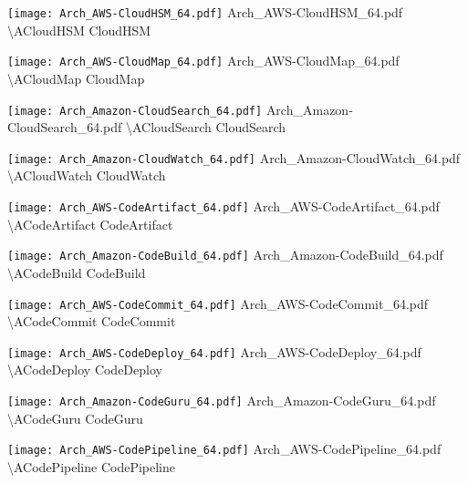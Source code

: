  {\texttt{[image: Arch\_AWS-CloudHSM\_64.pdf]}} {Arch\_AWS-CloudHSM\_64.pdf} {{\textbackslash}ACloudHSM} {CloudHSM}

 {\texttt{[image: Arch\_AWS-CloudMap\_64.pdf]}} {Arch\_AWS-CloudMap\_64.pdf} {{\textbackslash}ACloudMap} {CloudMap}

 {\texttt{[image: Arch\_Amazon-CloudSearch\_64.pdf]}} {Arch\_Amazon-CloudSearch\_64.pdf} {{\textbackslash}ACloudSearch} {CloudSearch}

 {\texttt{[image: Arch\_Amazon-CloudWatch\_64.pdf]}} {Arch\_Amazon-CloudWatch\_64.pdf} {{\textbackslash}ACloudWatch} {CloudWatch}

 {\texttt{[image: Arch\_AWS-CodeArtifact\_64.pdf]}} {Arch\_AWS-CodeArtifact\_64.pdf} {{\textbackslash}ACodeArtifact} {CodeArtifact}

 {\texttt{[image: Arch\_Amazon-CodeBuild\_64.pdf]}} {Arch\_Amazon-CodeBuild\_64.pdf} {{\textbackslash}ACodeBuild} {CodeBuild}

 {\texttt{[image: Arch\_AWS-CodeCommit\_64.pdf]}} {Arch\_AWS-CodeCommit\_64.pdf} {{\textbackslash}ACodeCommit} {CodeCommit}

 {\texttt{[image: Arch\_AWS-CodeDeploy\_64.pdf]}} {Arch\_AWS-CodeDeploy\_64.pdf} {{\textbackslash}ACodeDeploy} {CodeDeploy}

 {\texttt{[image: Arch\_Amazon-CodeGuru\_64.pdf]}} {Arch\_Amazon-CodeGuru\_64.pdf} {{\textbackslash}ACodeGuru} {CodeGuru}

 {\texttt{[image: Arch\_AWS-CodePipeline\_64.pdf]}} {Arch\_AWS-CodePipeline\_64.pdf} {{\textbackslash}ACodePipeline} {CodePipeline}

